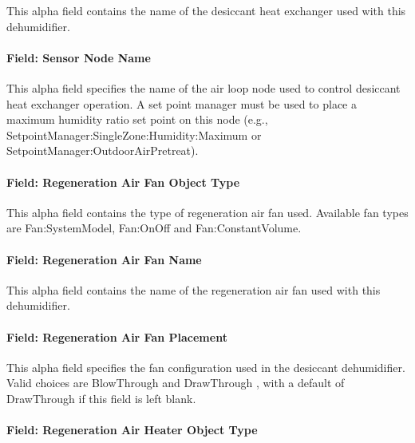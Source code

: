 This alpha field contains the name of the desiccant heat exchanger used with this dehumidifier.

\paragraph{Field: Sensor Node Name}\label{field-sensor-node-name-000}

This alpha field specifies the name of the air loop node used to control desiccant heat exchanger operation. A set point manager must be used to place a maximum humidity ratio set point on this node (e.g., SetpointManager:SingleZone:Humidity:Maximum or SetpointManager:OutdoorAirPretreat).

\paragraph{Field: Regeneration Air Fan Object Type}\label{field-regeneration-air-fan-object-type}

This alpha field contains the type of regeneration air fan used. Available fan types are Fan:SystemModel, Fan:OnOff and Fan:ConstantVolume.

\paragraph{Field: Regeneration Air Fan Name}\label{field-regeneration-air-fan-name}

This alpha field contains the name of the regeneration air fan used with this dehumidifier.

\paragraph{Field: Regeneration Air Fan Placement}\label{field-regeneration-air-fan-placement}

This alpha field specifies the fan configuration used in the desiccant dehumidifier. Valid choices are BlowThrough and DrawThrough , with a default of DrawThrough if this field is left blank.

\paragraph{Field: Regeneration Air Heater Object Type}\label{field-regeneration-air-heater-object-type}

